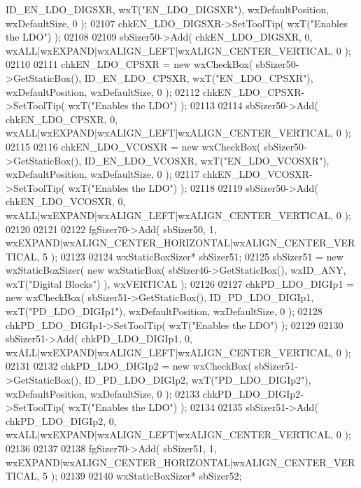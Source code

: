 \begin{DoxyCode}
      ID_EN_LDO_DIGSXR, wxT(\textcolor{stringliteral}{"EN\_LDO\_DIGSXR"}), wxDefaultPosition, wxDefaultSize, 0 );
02107     chkEN_LDO_DIGSXR->SetToolTip( wxT(\textcolor{stringliteral}{"Enables the LDO"}) );
02108     
02109     sbSizer50->Add( chkEN_LDO_DIGSXR, 0, wxALL|wxEXPAND|wxALIGN\_LEFT|wxALIGN\_CENTER\_VERTICAL, 0 );
02110     
02111     chkEN_LDO_CPSXR = \textcolor{keyword}{new} wxCheckBox( sbSizer50->GetStaticBox(), ID_EN_LDO_CPSXR, wxT(\textcolor{stringliteral}{"EN\_LDO\_CPSXR"}), 
      wxDefaultPosition, wxDefaultSize, 0 );
02112     chkEN_LDO_CPSXR->SetToolTip( wxT(\textcolor{stringliteral}{"Enables the LDO"}) );
02113     
02114     sbSizer50->Add( chkEN_LDO_CPSXR, 0, wxALL|wxEXPAND|wxALIGN\_LEFT|wxALIGN\_CENTER\_VERTICAL, 0 );
02115     
02116     chkEN_LDO_VCOSXR = \textcolor{keyword}{new} wxCheckBox( sbSizer50->GetStaticBox(), 
      ID_EN_LDO_VCOSXR, wxT(\textcolor{stringliteral}{"EN\_LDO\_VCOSXR"}), wxDefaultPosition, wxDefaultSize, 0 );
02117     chkEN_LDO_VCOSXR->SetToolTip( wxT(\textcolor{stringliteral}{"Enables the LDO"}) );
02118     
02119     sbSizer50->Add( chkEN_LDO_VCOSXR, 0, wxALL|wxEXPAND|wxALIGN\_LEFT|wxALIGN\_CENTER\_VERTICAL, 0 );
02120     
02121     
02122     fgSizer70->Add( sbSizer50, 1, wxEXPAND|wxALIGN\_CENTER\_HORIZONTAL|wxALIGN\_CENTER\_VERTICAL, 5 );
02123     
02124     wxStaticBoxSizer* sbSizer51;
02125     sbSizer51 = \textcolor{keyword}{new} wxStaticBoxSizer( \textcolor{keyword}{new} wxStaticBox( sbSizer46->GetStaticBox(), wxID\_ANY, wxT(\textcolor{stringliteral}{"Digital
       Blocks"}) ), wxVERTICAL );
02126     
02127     chkPD_LDO_DIGIp1 = \textcolor{keyword}{new} wxCheckBox( sbSizer51->GetStaticBox(), 
      ID_PD_LDO_DIGIp1, wxT(\textcolor{stringliteral}{"PD\_LDO\_DIGIp1"}), wxDefaultPosition, wxDefaultSize, 0 );
02128     chkPD_LDO_DIGIp1->SetToolTip( wxT(\textcolor{stringliteral}{"Enables the LDO"}) );
02129     
02130     sbSizer51->Add( chkPD_LDO_DIGIp1, 0, wxALL|wxEXPAND|wxALIGN\_LEFT|wxALIGN\_CENTER\_VERTICAL, 0 );
02131     
02132     chkPD_LDO_DIGIp2 = \textcolor{keyword}{new} wxCheckBox( sbSizer51->GetStaticBox(), 
      ID_PD_LDO_DIGIp2, wxT(\textcolor{stringliteral}{"PD\_LDO\_DIGIp2"}), wxDefaultPosition, wxDefaultSize, 0 );
02133     chkPD_LDO_DIGIp2->SetToolTip( wxT(\textcolor{stringliteral}{"Enables the LDO"}) );
02134     
02135     sbSizer51->Add( chkPD_LDO_DIGIp2, 0, wxALL|wxEXPAND|wxALIGN\_LEFT|wxALIGN\_CENTER\_VERTICAL, 0 );
02136     
02137     
02138     fgSizer70->Add( sbSizer51, 1, wxEXPAND|wxALIGN\_CENTER\_HORIZONTAL|wxALIGN\_CENTER\_VERTICAL, 5 );
02139     
02140     wxStaticBoxSizer* sbSizer52;

\end{DoxyCode}
